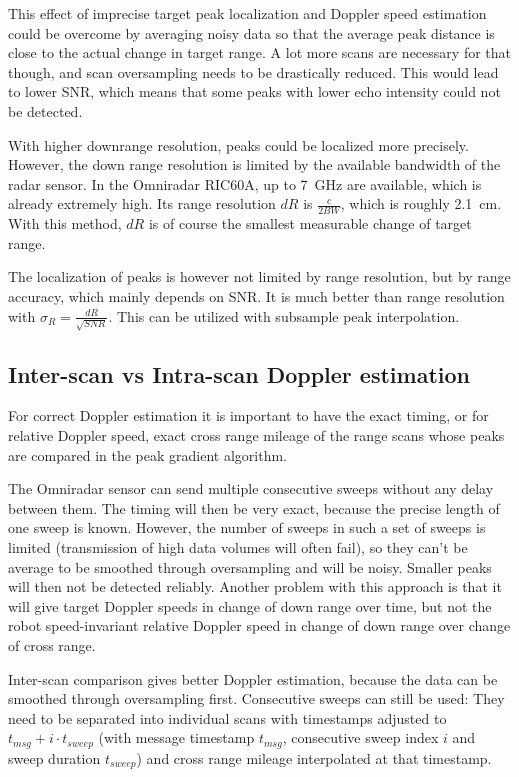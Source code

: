 This effect of imprecise target peak localization and Doppler speed
estimation could be overcome by averaging noisy data so that the average
peak distance is close to the actual change in target range. A lot more
scans are necessary for that though, and scan oversampling needs to be
drastically reduced. This would lead to lower SNR, which means that some
peaks with lower echo intensity could not be detected.

With higher downrange resolution, peaks could be localized more
precisely. However, the down range resolution is limited by the
available bandwidth of the radar sensor. In the Omniradar RIC60A, up to
\SI{7}{GHz} are available, which is already extremely high. Its range
resolution \(dR\) is \(\frac{c}{2 BW}\), which is roughly \SI{2.1}{cm}. With
this method, \(dR\) is of course the smallest measurable change of
target range.

The localization of peaks is however not limited by range resolution,
but by range accuracy, which mainly depends on SNR. It is much better
than range resolution with \(\sigma_R = \frac{dR}{\sqrt{SNR}}\). This
can be utilized with subsample peak interpolation.

\subsection{Inter-scan vs Intra-scan Doppler estimation}\label{inter-scan-vs-intra-scan-doppler-estimation}

For correct Doppler estimation it is important to have the exact timing,
or for relative Doppler speed, exact cross range mileage of the range
scans whose peaks are compared in the peak gradient algorithm.

The Omniradar sensor can send multiple consecutive sweeps without any
delay between them. The timing will then be very exact, because the
precise length of one sweep is known. However, the number of sweeps in
such a set of sweeps is limited (transmission of high data volumes will
often fail), so they can't be average to be smoothed through
oversampling and will be noisy. Smaller peaks will then not be detected
reliably. Another problem with this approach is that it will give target
Doppler speeds in change of down range over time, but not the robot
speed-invariant relative Doppler speed in change of down range over
change of cross range.

Inter-scan comparison gives better Doppler estimation, because the data
can be smoothed through oversampling first. Consecutive sweeps can still
be used: They need to be separated into individual scans with timestamps
adjusted to \(t_{msg} + i\cdot t_{sweep}\) (with message timestamp
\(t_{msg}\), consecutive sweep index \(i\) and sweep duration
\(t_{sweep}\)) and cross range mileage interpolated at that timestamp.

